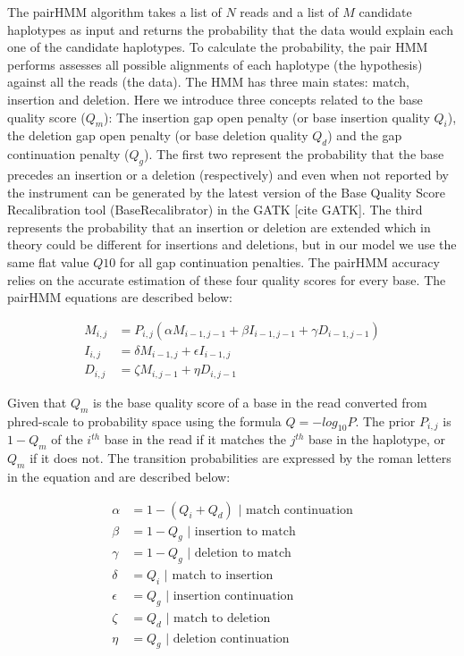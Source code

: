 \documentclass[11pt, oneside]{article}
\begin{document}
    The pairHMM algorithm takes a list of $N$ reads and a list of $M$ candidate
    haplotypes as input and returns the probability that the data would explain
    each one of the candidate haplotypes. To calculate the probability, the pair
    HMM performs assesses all possible alignments of each haplotype (the
    hypothesis) against all the reads (the data). The HMM has three main states:
    match, insertion and deletion. Here we introduce three concepts related to the
    base quality score ($Q_m$): The insertion gap open penalty (or base
    insertion quality $Q_i$), the deletion gap open penalty (or base deletion
    quality $Q_d$) and the gap continuation penalty ($Q_g$). The first two
    represent the probability that the base precedes an insertion or a deletion
    (respectively) and even when not reported by the instrument can be generated
    by the latest version of the Base Quality Score Recalibration tool
    (BaseRecalibrator) in the GATK [cite GATK]. The third represents the
    probability that an insertion or deletion are extended which in theory could
    be different for insertions and deletions, but in our model we use the same
    flat value $Q10$ for all gap continuation penalties. The pairHMM
    accuracy relies on the accurate estimation of these four quality scores for
    every base. The pairHMM equations are described below:

    \begin{align}
        M_{i,j} &= P_{i,j} (\alpha  M_{i-1,j-1} + \beta  I_{i-1,j-1} + \gamma D_{i-1,j-1} ) \\
        I_{i,j} &= \delta  M_{i-1,j} + \epsilon  I_{i-1,j} \\
        D_{i,j} &= \zeta   M_{i,j-1} + \eta  D_{i,j-1} 
    \end{align}

    Given that $Q_m$ is the base quality score of a base in the read converted
    from phred-scale to probability space using the formula $Q = -log_{10}P$. The
    prior $P_{i,j}$ is $1-Q_m$ of the $i^{th}$ base in the read if it matches
    the $j^{th}$ base in the haplotype, or $Q_m$ if it does not.  The transition
    probabilities are expressed by the roman letters in the equation and are
    described below: 

    \begin{align*}
        \alpha   &= 1 - (Q_i + Q_d) \text{ | match continuation} \\
        \beta    &= 1 - Q_g \text{ | insertion to match} \\
        \gamma   &= 1 - Q_g \text{ | deletion to match} \\
        \delta   &= Q_i \text{ | match to insertion} \\
        \epsilon &= Q_g \text{ | insertion continuation} \\
        \zeta    &= Q_d \text{ | match to deletion} \\
        \eta     &= Q_g \text{ | deletion continuation}
    \end{align*}
\end{document}
